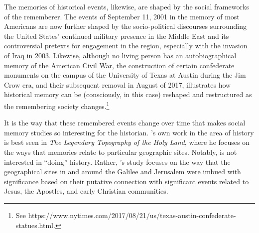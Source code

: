 The memories of historical events, likewise, are shaped by the social frameworks of the rememberer. The events of September 11, 2001 in the memory of most Americans are now further shaped by the socio-political discourses surrounding the United States' continued military presence in the Middle East and its controversial pretexts for engagement in the region, especially with the invasion of Iraq in 2003. Likewise, although no living person has an autobiographical memory of the American Civil War, the construction of certain confederate monuments on the campus of the University of Texas at Austin during the Jim Crow era, and their subsequent removal in August of 2017, illustrates how historical memory can be (consciously, in this case) reshaped and restructured as the remembering society changes.\footnote{See https://www.nytimes.com/2017/08/21/us/texas-austin-confederate-statues.html.}  

It is the way that these remembered events change over time that makes social memory studies so interesting for the historian. \halbwachs's own work in the area of history is best seen in \emph{The Legendary Topography of the Holy Land}, where he focuses on the ways that memories relate to particular geographic sites. Notably, \halbwachs is not interested in ``doing'' history. Rather, \halbwachs's study focuses on the way that the geographical sites in and around the Galilee and Jerusalem were imbued with significance based on their putative connection with significant events related to Jesus, the Apostles, and early Christian communities. 

